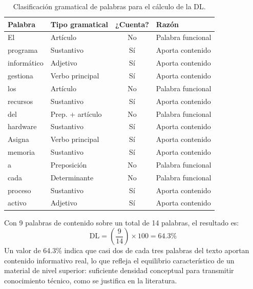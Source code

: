 \documentclass[11pt]{article}
\newcommand{\ttstyle}{%
  \small
  \setlength{\tabcolsep}{6pt}%
  \renewcommand{\arraystretch}{1.25}%
  \arrayrulecolor{azulprofundo}%
}
\newcommand{\hairrule}{%
  \arrayrulecolor{azulregla}\midrule[0.3pt]\arrayrulecolor{azulprofundo}%
}
\begin{document}
\begin{table}[H]
    \centering
    \ttstyle
    \begin{tabular}{p{2.1cm}p{4.1cm}cp{3.7cm}}
        \toprule
        \textbf{Palabra} & \textbf{Tipo gramatical} & \textbf{¿Cuenta?} & \textbf{Razón} \\
        \midrule
        El & Artículo & No & Palabra funcional \\
        \hairrule
        programa & Sustantivo & Sí & Aporta contenido \\
        \hairrule
        informático & Adjetivo & Sí & Aporta contenido \\
        \hairrule
        gestiona & Verbo principal & Sí & Aporta contenido \\
        \hairrule
        los & Artículo & No & Palabra funcional \\
        \hairrule
        recursos & Sustantivo & Sí & Aporta contenido \\
        \hairrule
        del & Prep. + artículo & No & Palabra funcional \\
        \hairrule
        hardware & Sustantivo & Sí & Aporta contenido \\
        \hairrule
        Asigna & Verbo principal & Sí & Aporta contenido \\
        \hairrule
        memoria & Sustantivo & Sí & Aporta contenido \\
        \hairrule
        a & Preposición & No & Palabra funcional \\
        \hairrule
        cada & Determinante & No & Palabra funcional \\
        \hairrule
        proceso & Sustantivo & Sí & Aporta contenido \\
        \hairrule
        activo & Adjetivo & Sí & Aporta contenido \\
        \bottomrule
    \end{tabular}
    \caption{Clasificación gramatical de palabras para el cálculo de la DL.}
\end{table}

Con 9 palabras de contenido sobre un total de 14 palabras, el resultado es:
\[
\mathrm{DL} = \left( \frac{9}{14} \right) \times 100 = 64.3\%
\]
Un valor de 64.3\% indica que casi dos de cada tres palabras del texto aportan contenido informativo real, lo que refleja el equilibrio característico de un material de nivel superior: suficiente densidad conceptual para transmitir conocimiento técnico, como se justifica en la literatura.
\end{document}
